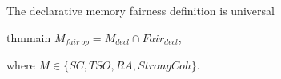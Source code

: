 \begin{frame}{The declarative memory fairness definition is universal}
  \begin{center}
    \begin{restatable}{thm}{main}    
      $M_{fair\ op} = M_{decl} \cap Fair_{decl}$,

      where $M \in \{SC, TSO, RA, StrongCoh\}$.
    \end{restatable}

  \end{center}
\end{frame}


